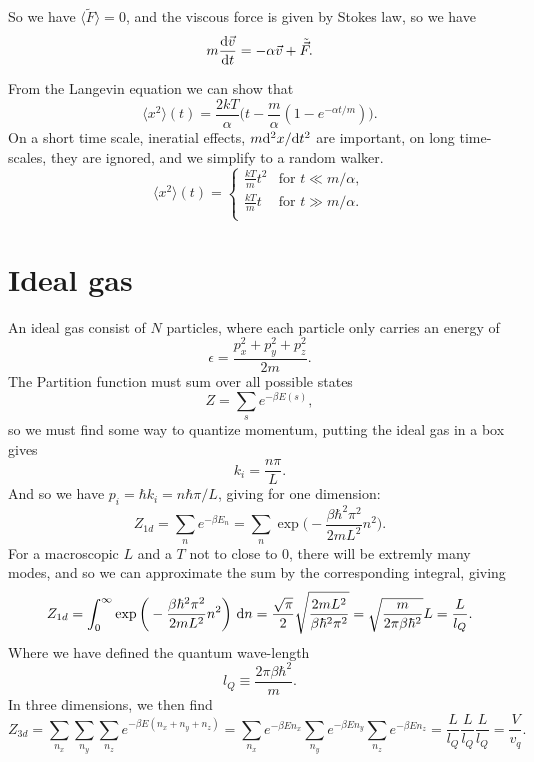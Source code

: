 \documentclass[a4paper, 11pt, notitlepage, english]{article}
\renewcommand{\d}{{\rm d}}
\newcommand{\eps}{\epsilon}
\begin{document}
So we have $\langle \tilde{F} \rangle = 0$, and the viscous force is given by Stokes law, so we have
$$m \frac{\d \vec{v}}{\d t} = -\alpha \vec{v} + \tilde{\vec{F}}.$$

From the Langevin equation we can show that
$$\langle x^2 \rangle(t) = \frac{2kT}{\alpha}\bigg(t - \frac{m}{\alpha}(1-e^{-\alpha t/m})\bigg).$$
On a short time scale, ineratial effects, $m\d^2 x / \d t^2$ are important, on long time-scales, they are ignored, and we simplify to a random walker.
$$\langle x^2 \rangle(t) = \begin{cases}
			\frac{kT}{m}t^2 & \mbox{for } t \ll m/\alpha, \\
			\frac{kT}{m}t & \mbox{for } t \gg m/\alpha. \\
\end{cases} $$
		



\section*{Ideal gas}
An ideal gas consist of $N$ particles, where each particle only carries an energy of
$$\eps = \frac{p_x^2 + p_y^2 + p_z^2}{2m}.$$
The Partition function must sum over all possible states
$$Z = \sum_s e^{-\beta E(s)},$$
so we must find some way to quantize momentum, putting the ideal gas in a box gives
$$k_i = \frac{n\pi}{L}.$$
And so we have $p_i = \hbar k_i = n\hbar \pi/L$, giving for one dimension:
$$Z_{1d} = \sum_n e^{-\beta E_n} = \sum_n \exp \bigg(-\frac{\beta \hbar^2 \pi^2}{2mL^2} n^2\bigg).$$
For a macroscopic $L$ and a $T$ not to close to 0, there will be extremly many modes, and so we can approximate the sum by the corresponding integral, giving
$$Z_{1d} = \int_0^\infty \exp \bigg(-\frac{\beta \hbar^2 \pi^2}{2mL^2} n^2\bigg) \ \d n = \frac{\sqrt{\pi}}{2} \sqrt{\frac{2mL^2}{\beta \hbar^2 \pi^2}} = \sqrt{\frac{m}{2\pi \beta \hbar^2}} L = \frac{L}{l_Q}.$$
Where we have defined the quantum wave-length
$$l_Q \equiv \frac{2\pi\beta\hbar^2}{m}.$$ 
In three dimensions, we then find
$$Z_{3d} = \sum_{n_x}\sum_{n_y}\sum_{n_z} e^{-\beta E(n_x + n_y + n_z)} = \sum_{n_x} e^{-\beta E n_x} \sum_{n_y} e^{-\beta E n_y} \sum_{n_z} e^{-\beta E n_z} = \frac{L}{l_Q}\frac{L}{l_Q}\frac{L}{l_Q} = \frac{V}{v_q}.$$
\end{document}
